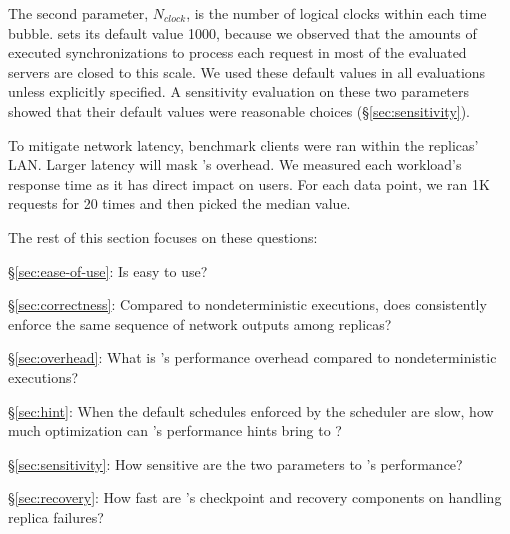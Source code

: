 The second parameter, $N_{clock}$, is the number of logical 
clocks within each time bubble. \xxx sets its default value 1000, because we 
observed that the amounts of executed \pthread synchronizations to process each 
request in most of the evaluated servers are closed to this scale. We used 
these default values in all evaluations unless explicitly specified. A 
sensitivity evaluation on these two parameters showed that their default 
values were reasonable choices (\S\ref{sec:sensitivity}).

To mitigate network latency, benchmark clients were ran within 
the replicas' LAN. Larger latency will mask \xxx's overhead. We measured each 
workload's response time as it has direct impact on users. For each data 
point, we ran 1K requests for 20 times and then picked the median value.

The rest of this section focuses on these questions:

\begin{tightenum}

\item[\S\ref{sec:ease-of-use}:] Is \xxx easy to use?

\item[\S\ref{sec:correctness}:] Compared to nondeterministic executions, does 
\xxx consistently enforce the same sequence of network outputs among replicas?

\item[\S\ref{sec:overhead}:] What is \xxx's performance overhead compared to 
nondeterministic executions?

\item[\S\ref{sec:hint}:] When the default schedules enforced by the \parrot 
\dmt scheduler are slow, how much optimization can \parrot's performance hints 
bring to \xxx?

\item[\S\ref{sec:sensitivity}:] How sensitive are the two \timealgo parameters 
to \xxx's performance?

\item[\S\ref{sec:recovery}:] How fast are \xxx's checkpoint and recovery 
components on handling replica failures?



\end{tightenum}







